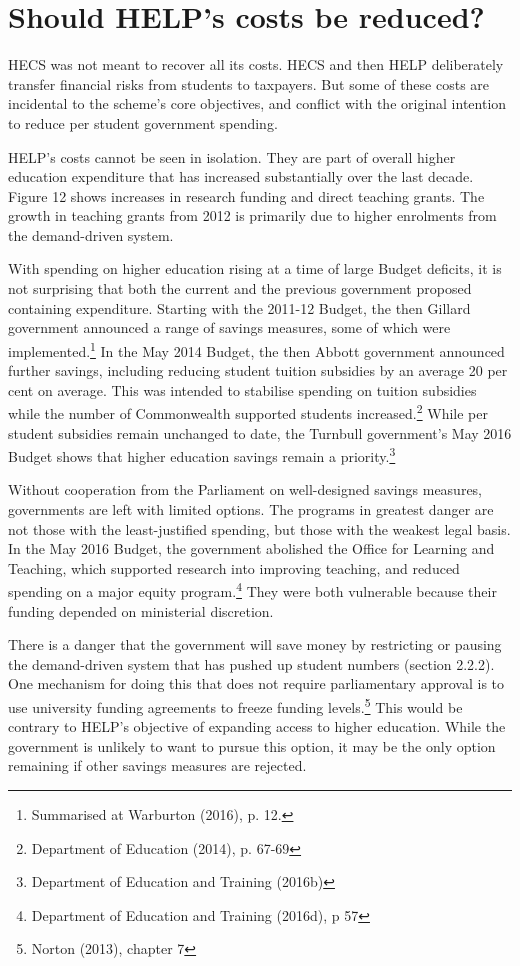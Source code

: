 \documentclass[]{book}
\begin{document}
\section{Should HELP's costs be reduced?}\label{should-helps-costs-be-reduced}

HECS was not meant to recover all its costs. HECS and then HELP deliberately transfer financial risks from students to taxpayers. But some of these costs are incidental to the scheme's core objectives, and conflict with the original intention to reduce per student government spending.

HELP's costs cannot be seen in isolation. They are part of overall higher education expenditure that has increased substantially over the last decade. Figure 12 shows increases in research funding and direct teaching grants. The growth in teaching grants from 2012 is primarily due to higher enrolments from the demand-driven system.

With spending on higher education rising at a time of large Budget deficits, it is not surprising that both the current and the previous government proposed containing expenditure. Starting with the 2011-12 Budget, the then Gillard government announced a range of savings measures, some of which were implemented.\footnote{Summarised at Warburton (2016), p. 12.} In the May 2014 Budget, the then Abbott government announced further savings, including reducing student tuition subsidies by an average 20 per cent on average. This was intended to stabilise spending on tuition subsidies while the number of Commonwealth supported students increased.\footnote{Department of Education (2014), p. 67-69} While per student subsidies remain unchanged to date, the Turnbull government's May 2016 Budget shows that higher education savings remain a priority.\footnote{Department of Education and Training (2016b)}

Without cooperation from the Parliament on well-designed savings measures, governments are left with limited options. The programs in greatest danger are not those with the least-justified spending, but those with the weakest legal basis. In the May 2016 Budget, the government abolished the Office for Learning and Teaching, which supported research into improving teaching, and reduced spending on a major equity program.\footnote{Department of Education and Training (2016d), p 57} They were both vulnerable because their funding depended on ministerial discretion.

There is a danger that the government will save money by restricting or pausing the demand-driven system that has pushed up student numbers (section 2.2.2). One mechanism for doing this that does not require parliamentary approval is to use university funding agreements to freeze funding levels.\footnote{Norton (2013), chapter 7} This would be contrary to HELP's objective of expanding access to higher education. While the government is unlikely to want to pursue this option, it may be the only option remaining if other savings measures are rejected.
\end{document}
